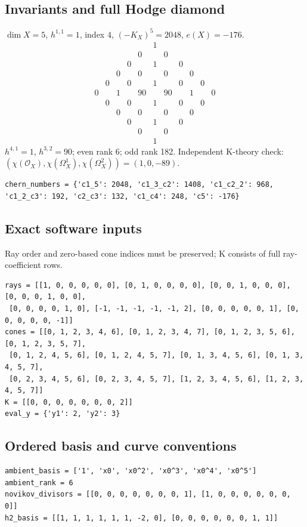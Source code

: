 \documentclass[10pt,a4paper]{article}
\begin{document}
\subsection*{Invariants and full Hodge diamond}
$\dim X=5$, $h^{1,1}=1$, index $4$, $(-K_X)^5=2048$, $e(X)=-176$.
\[\begin{array}{ccccccccccc}&&&&&1&&&&&\\&&&&0&&0&&&&\\&&&0&&1&&0&&&\\&&0&&0&&0&&0&&\\&0&&0&&1&&0&&0&\\0&&1&&90&&90&&1&&0\\&0&&0&&1&&0&&0&\\&&0&&0&&0&&0&&\\&&&0&&1&&0&&&\\&&&&0&&0&&&&\\&&&&&1&&&&&\end{array}\]
$h^{4,1}=1$, $h^{3,2}=90$; even rank 6; odd rank 182.
Independent K-theory check: $(\chi(\mathcal O_X),\chi(\Omega_X^1),\chi(\Omega_X^2))=(1, 0, -89)$.
\begin{lstlisting}
chern_numbers = {'c1_5': 2048, 'c1_3_c2': 1408, 'c1_c2_2': 968, 'c1_2_c3': 192, 'c2_c3': 132, 'c1_c4': 248, 'c5': -176}
\end{lstlisting}
\subsection*{Exact software inputs}
Ray order and zero-based cone indices must be preserved; K consists of full ray-coefficient rows.
\begin{lstlisting}
rays = [[1, 0, 0, 0, 0, 0], [0, 1, 0, 0, 0, 0], [0, 0, 1, 0, 0, 0], [0, 0, 0, 1, 0, 0],
 [0, 0, 0, 0, 1, 0], [-1, -1, -1, -1, -1, 2], [0, 0, 0, 0, 0, 1], [0, 0, 0, 0, 0, -1]]
cones = [[0, 1, 2, 3, 4, 6], [0, 1, 2, 3, 4, 7], [0, 1, 2, 3, 5, 6], [0, 1, 2, 3, 5, 7],
 [0, 1, 2, 4, 5, 6], [0, 1, 2, 4, 5, 7], [0, 1, 3, 4, 5, 6], [0, 1, 3, 4, 5, 7],
 [0, 2, 3, 4, 5, 6], [0, 2, 3, 4, 5, 7], [1, 2, 3, 4, 5, 6], [1, 2, 3, 4, 5, 7]]
K = [[0, 0, 0, 0, 0, 0, 0, 2]]
eval_y = {'y1': 2, 'y2': 3}
\end{lstlisting}
\subsection*{Ordered basis and curve conventions}
\begin{lstlisting}
ambient_basis = ['1', 'x0', 'x0^2', 'x0^3', 'x0^4', 'x0^5']
ambient_rank = 6
novikov_divisors = [[0, 0, 0, 0, 0, 0, 0, 1], [1, 0, 0, 0, 0, 0, 0, 0]]
h2_basis = [[1, 1, 1, 1, 1, 1, -2, 0], [0, 0, 0, 0, 0, 0, 1, 1]]
\end{lstlisting}
\end{document}
